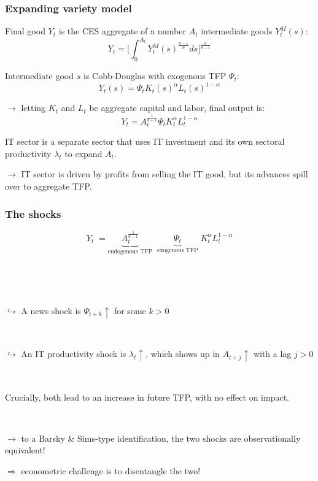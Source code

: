 \documentclass{beamer}
\begin{document}
\begin{frame}
	\frametitle{Expanding variety model}
	\label{expanding_variety}
	
Final good $Y_t$ is the CES aggregate of a number $A_t$ intermediate goods $Y_t^M(s)$:	%
	\begin{equation}
	Y_t = \Big[ \int_{0}^{A_t} Y_t^M(s)^{\frac{\theta-1}{\theta} } ds \Big]^{\frac{\theta}{\theta-1}}
	\end{equation}

\pause

Intermediate good $s$ is Cobb-Douglas with exogenous TFP $\Psi_t$:
\begin{equation}
Y_t(s) = \Psi_t K_t(s)^{\alpha}L_t(s)^{1-\alpha}
\end{equation}

\pause

$\rightarrow$ letting $K_t$ and $L_t$ be aggregate capital and labor, final output is:
\begin{equation}
Y_t = A_t^{\frac{1}{\theta-1}} \Psi_t K_t^{\alpha}L_t^{1-\alpha}
\end{equation}


\pause 

IT sector is a separate sector that uses IT investment and its own sectoral productivity $\lambda_t$ to expand $A_t$.  \hyperlink{it_sector}{}

$\rightarrow$ IT sector is driven by profits from selling the IT good, but its advances spill over to aggregate TFP.



\end{frame}

\begin{frame}
	\frametitle{The shocks}

	
\begin{equation*}
Y_t \; = \underbrace{A_t^{\frac{1}{\theta-1}}}_\text{endogenous TFP} \; \; \underbrace{\Psi_t}_\text{exogenous TFP} \; K_t^{\alpha}L_t^{1-\alpha}
\end{equation*}

\

\

$\hookrightarrow$ A news shock is $\Psi_{t+k} \uparrow$ for some $k>0$

\

$\hookrightarrow$ An IT productivity shock is $\lambda_t \uparrow$, which shows up in $A_{t+j} \uparrow$ with a lag $j>0$

\

Crucially, both lead to an increase in future TFP, with no effect on impact. 

\

 $\rightarrow$ to a Barsky \& Sims-type identification, the two shocks are observationally equivalent! 
 
 $\Rightarrow$ econometric challenge is to disentangle the two!

\end{frame}
\end{document}

